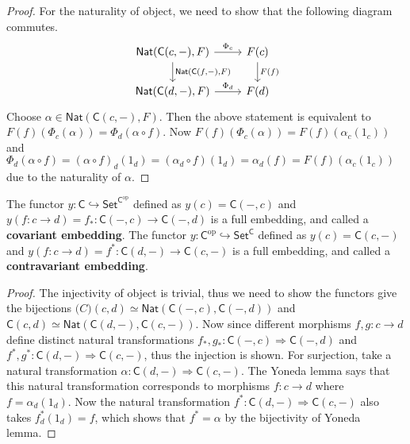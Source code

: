 \begin{proof}
For the naturality of object, we need to show that the following diagram commutes.
\begin{equation}
\begin{tikzcd}
\mathsf{Nat}(\mathsf{C}(c,-),F)\arrow{r}{\Phi_c} \arrow{d}{\mathsf{Nat}(\mathsf{C}(f,-),F)}&F(c)\arrow{d}{F(f)}\\
\mathsf{Nat}(\mathsf{C}(d,-),F)\arrow{r}{\Phi_d} & F(d)
\end{tikzcd}
\end{equation}
Choose $\alpha\in\mathsf{Nat}(\mathsf{C}(c,-),F)$. Then the above statement is equivalent to $F(f)(\Phi_c(\alpha))=\Phi_d(\alpha\circ f)$. Now $F(f)(\Phi_c(\alpha))=F(f)(\alpha_c(1_c))$ and $\Phi_d(\alpha\circ f)=(\alpha\circ f)_d(1_d)=(\alpha_d\circ f)(1_d)=\alpha_d(f)=F(f)(\alpha_c(1_c))$ due to the naturality of $\alpha$.
\end{proof}

\begin{cor} The functor $y:\mathsf{C}\hookrightarrow \mathsf{Set}^{\mathsf{C}^{\textrm{op}}}$ defined as $y(c)=\mathsf{C}(-,c)$ and $y(f:c\rightarrow d)=f_*:\mathsf{C}(-,c)\rightarrow \mathsf{C}(-,d)$ is a full embedding, and called a \textbf{covariant embedding}. The functor $y:\mathsf{C}^{\textrm{op}}\hookrightarrow \mathsf{Set}^{\mathsf{C}}$ defined as $y(c)=\mathsf{C}(c,-)$ and $y(f:c\rightarrow d)=f^*:\mathsf{C}(d,-)\rightarrow \mathsf{C}(c,-)$ is a full embedding, and called a \textbf{contravariant embedding}.
\end{cor}
\begin{proof}
The injectivity of object is trivial, thus we need to show the functors give the bijections $\mathsf(C)(c,d)\simeq \mathsf{Nat}(\mathsf{C}(-,c),\mathsf{C}(-,d))$ and $\mathsf{C}(c,d)\simeq \mathsf{Nat}(\mathsf{C}(d,-),\mathsf{C}(c,-))$. Now since different morphisms $f,g:c\rightarrow d$ define distinct natural transformations $f_*,g_*:\mathsf{C}(-,c)\Rightarrow \mathsf{C}(-,d)$ and $f^*,g^*:\mathsf{C}(d,-)\Rightarrow \mathsf{C}(c,-)$, thus the injection is shown. For surjection, take a natural transformation $\alpha:\mathsf{C}(d,-)\Rightarrow \mathsf{C}(c,-)$. The Yoneda lemma says that this natural transformation corresponds to morphisms $f:c\rightarrow d$ where $f=\alpha_d(1_d)$. Now the natural transformation $f^*:\mathsf{C}(d,-)\Rightarrow \mathsf{C}(c,-)$ also takes $f^*_d(1_d)=f$, which shows that $f^*=\alpha$ by the bijectivity of Yoneda lemma.
\end{proof}

